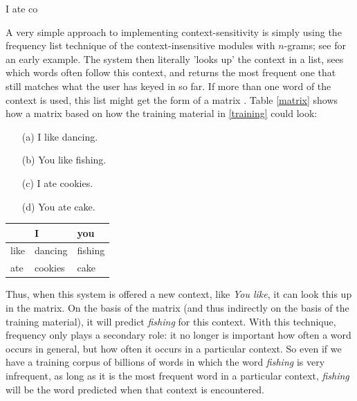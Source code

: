 \documentclass[12pt]{article}
\begin{document}
\begin{examples}
\item I ate co \label{iate}
\end{examples}

A very simple approach to implementing context-sensitivity is simply using the frequency list technique of the context-insensitive modules with $n$-grams;  see  for an early example. The system then literally 'looks up' the context in a list, sees which words often follow this context, and returns the most frequent one that still matches what the user has keyed in so far. If more than one word of the context is used, this list might get the form of a matrix \cite{Garay-Vitoria+06}. Table \ref{matrix} shows how a matrix based on how the training material in \ref{training} could look:

\begin{examples}

\item 

\begin{itemize} \label{training}
\item[(a)] I like dancing.
\item[(b)] You like fishing.
\item[(c)] I ate cookies.
\item[(d)] You ate cake.
\end{itemize}

\item \begin{tabular}{l|ll}
&I&you\\
\hline
like&dancing&fishing\\
ate&cookies&cake\\
\end{tabular} \label{matrix}

\end{examples}

Thus, when this system is offered a new context, like \emph{You like}, it can look this up in the matrix. On the basis of the matrix (and thus indirectly on the basis of the training material), it will predict \emph{fishing} for this context. With this technique, frequency only plays a secondary role: it no longer is important how often a word occurs in general, but how often it occurs in a particular context. So even if we have a training corpus of billions of words in which the word \emph{fishing} is very infrequent, as long as it is the most frequent word in a particular context, \emph{fishing} will be the word predicted when that context is encountered.
\end{document}
